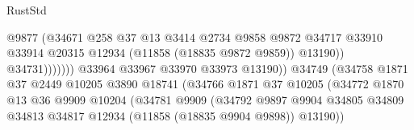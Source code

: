 \begin{lexlean}{RustStd}
\begin{coremodule}
                                                    @9877
                                                    (@34671
                                                      @258
                                                      @37
                                                      @13
                                                      @3414
                                                      @2734
                                                      @9858
                                                      @9872
                                                      @34717
                                                      @33910
                                                      @33914
                                                      @20315
                                                      @12934
                                                      (@11858 (@18835 @9872 @9859))
                                                      @13190))
                                                  @34731)))))))
                                    @33964
                                    @33967
                                    @33970
                                    @33973
                                    @13190))
                                @34749
                                (@34758
                                  @1871
                                  @37
                                  @2449
                                  @10205
                                  @3890
                                  @18741
                                  (@34766
                                    @1871
                                    @37
                                    @10205
                                    (@34772
                                      @1870
                                      @13
                                      @36
                                      @9909
                                      @10204
                                      (@34781
                                        @9909
                                        (@34792
                                          @9897
                                          @9904
                                          @34805
                                          @34809
                                          @34813
                                          @34817
                                          @12934
                                          (@11858 (@18835 @9904 @9898))
                                          @13190))

\end{coremodule}
\end{lexlean}
